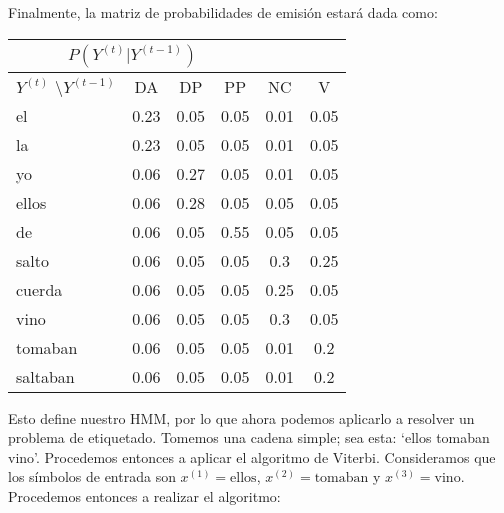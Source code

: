 Finalmente, la matriz de probabilidades de emisión estará dada como:

\begin{center}
 \begin{tabular}{l|ccccc}
  \multicolumn{4}{c}{$P(Y^{(t)}|Y^{(t-1)})$} \\ \hline
  $Y^{(t)}$ \textbackslash $Y^{(t-1)}$          & DA & DP & PP & NC & V \\ \hline
  el        & 0.23  & 0.05  & 0.05 & 0.01   & 0.05  \\
  la        & 0.23  & 0.05  & 0.05 & 0.01    & 0.05 \\
  yo        & 0.06  & 0.27  & 0.05 & 0.01    & 0.05  \\
  ellos     & 0.06  & 0.28  & 0.05 & 0.05 & 0.05 \\
  de        & 0.06  & 0.05  & 0.55 & 0.05 & 0.05 \\
  salto     & 0.06  & 0.05  & 0.05   & 0.3  & 0.25 \\
  cuerda    & 0.06  & 0.05  & 0.05  & 0.25  & 0.05 \\
  vino      & 0.06  & 0.05  & 0.05   & 0.3  & 0.05 \\
  tomaban   & 0.06  & 0.05  & 0.05   & 0.01    & 0.2 \\
  saltaban  & 0.06  & 0.05  & 0.05   & 0.01    & 0.2 \\
 \end{tabular}
 \end{center}


 Esto define nuestro HMM, por lo que ahora podemos aplicarlo a resolver un problema de etiquetado. Tomemos una cadena simple; sea esta: `ellos tomaban vino'. Procedemos entonces a aplicar el algoritmo de Viterbi. Consideramos que los símbolos de entrada son $x^{(1)} = \text{ellos}$, $x^{(2)} = \text{tomaban}$ y $x^{(3)} = \text{vino}$. Procedemos entonces a realizar el algoritmo:


